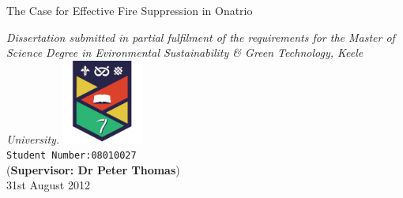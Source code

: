 \documentclass{article}
\begin{document}

\begin{titlepage}
\begin{center}
\phantom
\phantom
\phantom
\phantom
\phantom
\phantom
\phantom
\phantom
\phantom
\phantom
\phantom
\phantom
\begin{spacing}{1.5}
{ \Large The Case for Effective Fire Suppression in Onatrio}\\
\end{spacing}
\vfill
\emph{Dissertation submitted in partial fulfilment of the requirements for the Master of Science Degree in Evironmental Sustainability \& Green Technology, Keele University.} \vfill
\includegraphics[width=0.2\textwidth]{media/logo}\\
\phantom
\phantom
\phantom
\phantom
\texttt{Student Number:08010027}\\
(\textbf{Supervisor: Dr Peter Thomas})\\[.5cm]

31st August 2012\\[.5cm]

\end{center}

\end{titlepage}


\begin{spacing}{2}
\phantom
\phantom
\phantom
\phantom
\tableofcontents
\end{spacing}
\clearpage
\begin{spacing}{2}
\phantom
\phantom
\phantom
\phantom
\listoffigures
\end{spacing}
\clearpage
\begin{spacing}{2}
\phantom
\phantom
\phantom
\phantom
\listoftables
\end{spacing}
\clearpage
{}












\end{document}
